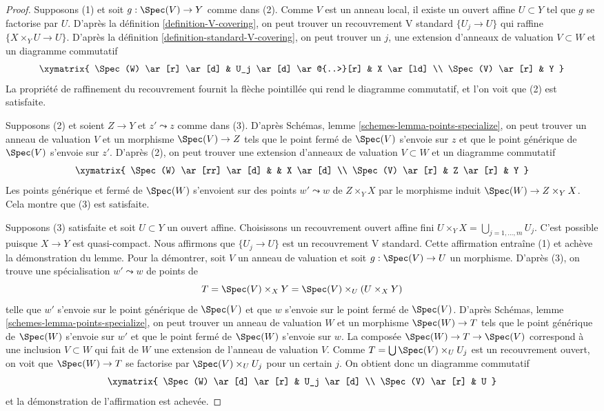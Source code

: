 \begin{proof}
Supposons (1) et soit $g : \Spec(V) \to Y$ comme dans (2).
Comme $V$ est un anneau local, il existe un ouvert affine $U \subset Y$
tel que $g$ se factorise par $U$. D'après la définition \ref{definition-V-covering},
on peut trouver un recouvrement V standard $\{U_j \to U\}$ qui raffine
$\{X \times_Y U \to U\}$. D'après la définition \ref{definition-standard-V-covering},
on peut trouver un $j$, une extension d'anneaux de valuation $V \subset W$
et un diagramme commutatif
$$
\xymatrix{
\Spec(W) \ar[r] \ar[d] & U_j \ar[d] \ar@{..>}[r] & X \ar[ld] \\
\Spec(V) \ar[r] & Y
}
$$
La propriété de raffinement du recouvrement fournit la flèche pointillée
qui rend le diagramme commutatif, et l'on voit que (2) est satisfaite.

\medskip\noindent
Supposons (2) et soient $Z \to Y$ et $z' \leadsto z$ comme dans (3).
D'après Schémas, lemme \ref{schemes-lemma-points-specialize},
on peut trouver un anneau de valuation $V$ et un morphisme $\Spec(V) \to Z$
tels que le point fermé de $\Spec(V)$ s'envoie sur $z$ et que le
point générique de $\Spec(V)$ s'envoie sur $z'$. D'après (2), on peut trouver une
extension d'anneaux de valuation $V \subset W$ et un
diagramme commutatif
$$
\xymatrix{
\Spec(W) \ar[rr] \ar[d] & & X \ar[d] \\
\Spec(V) \ar[r] & Z \ar[r] & Y
}
$$
Les points générique et fermé de $\Spec(W)$ s'envoient sur des points
$w' \leadsto w$ de $Z \times_Y X$ par le
morphisme induit $\Spec(W) \to Z \times_Y X$.
Cela montre que (3) est satisfaite.

\medskip\noindent
Supposons (3) satisfaite et soit $U \subset Y$ un ouvert affine.
Choisissons un recouvrement ouvert affine fini
$U \times_Y X = \bigcup_{j = 1, \ldots, m} U_j$.
C'est possible puisque $X \to Y$ est quasi-compact.
Nous affirmons que $\{U_j \to U\}$ est un recouvrement V standard.
Cette affirmation entraîne (1) et achève la démonstration du lemme.
Pour la démontrer, soit $V$ un anneau de valuation
et soit $g : \Spec(V) \to U$ un morphisme.
D'après (3), on trouve une spécialisation $w' \leadsto w$ de
points de
$$
T = \Spec(V) \times_X Y = \Spec(V) \times_U (U \times_X Y)
$$
telle que $w'$ s'envoie sur le point générique de $\Spec(V)$
et que $w$ s'envoie sur le point fermé de $\Spec(V)$.
D'après Schémas, lemme \ref{schemes-lemma-points-specialize},
on peut trouver un anneau de valuation $W$ et un morphisme
$\Spec(W) \to T$ tels que le point générique de $\Spec(W)$
s'envoie sur $w'$ et que le point fermé de $\Spec(W)$ s'envoie sur $w$.
La composée $\Spec(W) \to T \to \Spec(V)$ correspond
à une inclusion $V \subset W$ qui fait de $W$ une
extension de l'anneau de valuation $V$.
Comme $T = \bigcup \Spec(V) \times_U U_j$ est un recouvrement
ouvert, on voit que $\Spec(W) \to T$ se factorise par
$\Spec(V) \times_U U_j$ pour un certain $j$. On obtient donc
un diagramme commutatif
$$
\xymatrix{
\Spec(W) \ar[d] \ar[r] & U_j \ar[d] \\
\Spec(V) \ar[r] & U
}
$$
et la démonstration de l'affirmation est achevée.
\end{proof}

